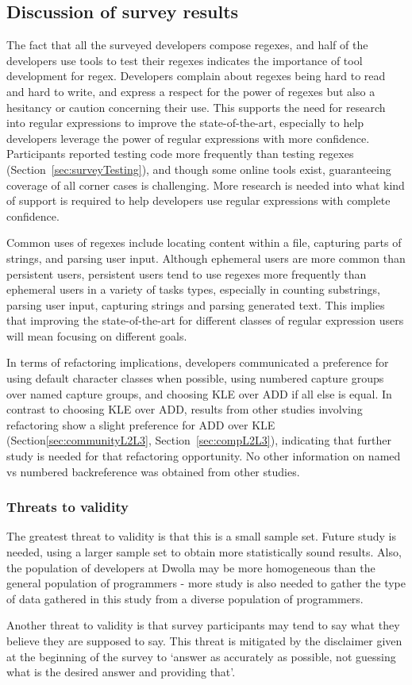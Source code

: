 \subsection{Discussion of survey results}

The fact that all the surveyed developers compose regexes, and half of the developers use tools to test their regexes indicates the importance of tool development for regex.  Developers complain about regexes being hard to read and hard to write, and express a respect for the power of regexes but also a hesitancy or caution concerning their use.  This supports the need for research into regular expressions to improve the state-of-the-art, especially to help developers leverage the power of regular expressions with more confidence.  Participants reported testing code more frequently than testing regexes (Section~\ref{sec:surveyTesting}), and though some online tools exist, guaranteeing coverage of all corner cases is challenging.  More research is needed into what kind of support is required to help developers use regular expressions with complete confidence.

Common uses of regexes include locating content within a file, capturing parts of strings, and parsing user input.  Although ephemeral users are more common than persistent users, persistent users tend to use regexes more frequently than ephemeral users in a variety of tasks types, especially in counting substrings, parsing user input, capturing strings and parsing generated text.  This implies that improving the state-of-the-art for different classes of regular expression users will mean focusing on different goals.

In terms of refactoring implications, developers communicated a preference for using default character classes when possible, using numbered capture groups over named capture groups, and choosing KLE over ADD if all else is equal.  In contrast to choosing KLE over ADD, results from other studies involving refactoring show a slight preference for ADD over KLE (Section\ref{sec:communityL2L3}, Section~\ref{sec:compL2L3}), indicating that further study is needed for that refactoring opportunity. No other information on named vs numbered backreference was obtained from other studies.

\subsubsection{Threats to validity}
The greatest threat to validity is that this is a small sample set.  Future study is needed, using a larger sample set to obtain more statistically sound results.  Also, the population of developers at Dwolla may be more homogeneous than the general population of programmers - more study is also needed to gather the type of data gathered in this study from a diverse population of programmers.

Another threat to validity is that survey participants may tend to say what they believe they are supposed to say.  This threat is mitigated by the disclaimer given at the beginning of the survey to `answer as accurately as possible, not guessing what is the desired answer and providing that'.


